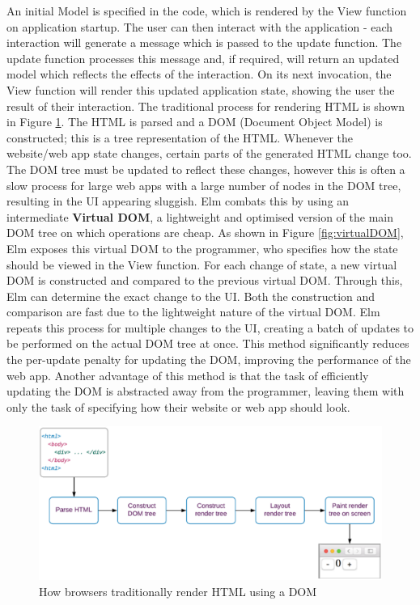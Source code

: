 An initial Model is specified in the code, which is rendered by the View function on application startup. The user can then interact with the application - each interaction will generate a message which is passed to the update function. The update function processes this message and, if required, will return an updated model which reflects the effects of the interaction. On its next invocation, the View function will render this updated application state, showing the user the result of their interaction.
The traditional process for rendering HTML is shown in Figure \ref{fig:tradDOM}. The HTML is parsed and a DOM (Document Object Model) is constructed; this is a tree representation of the HTML. Whenever the website/web app state changes, certain parts of the generated HTML change too. The DOM tree must be updated to reflect these changes, however this is often a slow process for large web apps with a large number of nodes in the DOM tree, resulting in the UI appearing sluggish. Elm combats this by using an intermediate \textbf{Virtual DOM}, a lightweight and optimised version of the main DOM tree on which operations are cheap. As shown in Figure \ref{fig:virtualDOM}, Elm exposes this virtual DOM to the programmer, who specifies how the state should be viewed in the View function. For each change of state, a new virtual DOM is constructed and compared to the previous virtual DOM. Through this, Elm can determine the exact change to the UI. Both the construction and comparison are fast due to the lightweight nature of the virtual DOM. Elm repeats this process for multiple changes to the UI, creating a batch of updates to be performed on the actual DOM tree at once. This method significantly reduces the per-update penalty for updating the DOM, improving the performance of the web app. Another advantage of this method is that the task of efficiently updating the DOM is abstracted away from the programmer, leaving them with only the task of specifying how their website or web app should look.

\begin{figure} [h]
    \centering
    \includegraphics[width=\textwidth]{02.Background/traditionalDOM.eps}
    \caption{How browsers traditionally render HTML using a DOM \cite{virtualdom}}
    \label{fig:tradDOM}
\end{figure}


